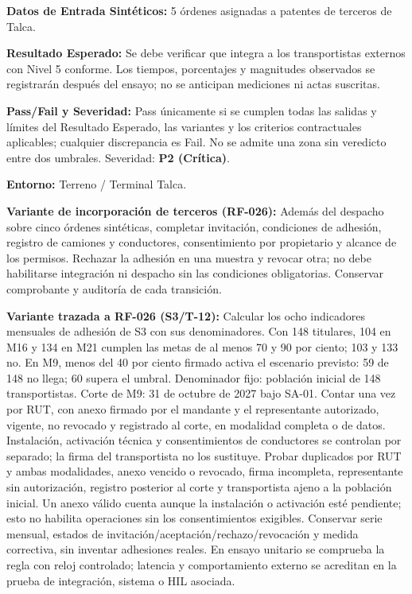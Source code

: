 \par\noindent\textbf{Datos de Entrada Sintéticos:} 5 órdenes asignadas a patentes de terceros de Talca.\par
\par\noindent\textbf{Resultado Esperado:} Se debe verificar que integra a los transportistas externos con Nivel 5 conforme. Los tiempos, porcentajes y magnitudes observados se registrarán después del ensayo; no se anticipan mediciones ni actas suscritas.\par
\par\noindent\textbf{Pass/Fail y Severidad:} Pass únicamente si se cumplen todas las salidas y límites del Resultado Esperado, las variantes y los criterios contractuales aplicables; cualquier discrepancia es Fail. No se admite una zona sin veredicto entre dos umbrales. Severidad: \textbf{P2 (Crítica)}.\par
\par\noindent\textbf{Entorno:} Terreno / Terminal Talca.\par

\par\noindent\textbf{Variante de incorporación de terceros (RF-026):} Además del despacho sobre cinco órdenes sintéticas, completar invitación, condiciones de adhesión, registro de camiones y conductores, consentimiento por propietario y alcance de los permisos. Rechazar la adhesión en una muestra y revocar otra; no debe habilitarse integración ni despacho sin las condiciones obligatorias. Conservar comprobante y auditoría de cada transición.\par

\par\noindent\textbf{Variante trazada a RF-026 (S3/T-12):} Calcular los ocho indicadores mensuales de adhesión de S3 con sus denominadores. Con 148 titulares, 104 en M16 y 134 en M21 cumplen las metas de al menos 70 y 90 por ciento; 103 y 133 no. En M9, menos del 40 por ciento firmado activa el escenario previsto: 59 de 148 no llega; 60 supera el umbral. Denominador fijo: población inicial de 148 transportistas. Corte de M9: 31 de octubre de 2027 bajo SA-01. Contar una vez por RUT, con anexo firmado por el mandante y el representante autorizado, vigente, no revocado y registrado al corte, en modalidad completa o de datos. Instalación, activación técnica y consentimientos de conductores se controlan por separado; la firma del transportista no los sustituye. Probar duplicados por RUT y ambas modalidades, anexo vencido o revocado, firma incompleta, representante sin autorización, registro posterior al corte y transportista ajeno a la población inicial. Un anexo válido cuenta aunque la instalación o activación esté pendiente; esto no habilita operaciones sin los consentimientos exigibles. Conservar serie mensual, estados de invitación/aceptación/rechazo/revocación y medida correctiva, sin inventar adhesiones reales. En ensayo unitario se comprueba la regla con reloj controlado; latencia y comportamiento externo se acreditan en la prueba de integración, sistema o HIL asociada.\par

